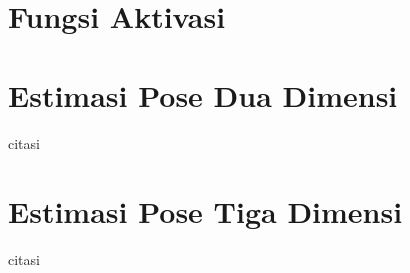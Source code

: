 \section{Fungsi Aktivasi}
\label{sec:2-FungsiAktivasi}

\section{Estimasi Pose Dua Dimensi}
\label{sec:2-EstimasiPoseDuaDimensi}
citasi~\cite{8765346}

\section{Estimasi Pose Tiga Dimensi}
\label{sec:2-EstimasiPoseTigaDimensi}
citasi~\cite{martinez_2017_3dbaseline}
